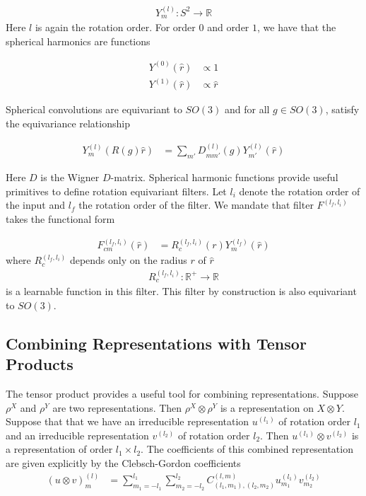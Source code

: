 \documentclass[book.tex]{subfiles}
\begin{document}
\begin{align}
    Y^{(l)}_m: S^2 \to \mathbb{R}
\end{align}
Here $l$ is again the rotation order. For order $0$ and order $1$, we have that the spherical harmonics are functions

\begin{align}
    Y^{(0)}(\hat{r}) &\propto 1 \\
    Y^{(1)}(\hat{r}) &\propto \hat{r} 
\end{align}

Spherical convolutions are equivariant to $SO(3)$ and for all $g \in SO(3)$, satisfy the equivariance relationship
    
\begin{align}
    Y^{(l)}_m(R(g)\hat{r}) &= \sum_{m'} D^{(l)}_{mm'}(g)Y^{(l)}_{m'}(\hat{r})
\end{align}

Here $D$ is the Wigner $D$-matrix. Spherical harmonic functions provide useful primitives to define rotation equivariant filters. Let $l_i$ denote the rotation order of the input and $l_f$ the rotation order of the filter. We mandate that filter $F^{(l_f, l_i)}$ takes the functional form

\begin{align}
    F^{(l_f, l_i)}_{cm}(\hat{r}) &= R_c^{(l_f, l_i)}(r) Y^{(l_f)}_m(\hat{r})
\end{align}
where $R_c^{(l_f, l_i)}$ depends only on the radius $r$ of $\hat{r}$ 
\begin{align}
R_c^{(l_f, l_i)}: \mathbb{R}^+ \to \mathbb{R}
\end{align} is a learnable function in this filter. This filter by construction is also equivariant to $SO(3)$. 

\subsection{Combining Representations with Tensor Products}

The tensor product provides a useful tool for combining representations. Suppose $\rho^X$ and $\rho^Y$ are two representations. Then $\rho^X \otimes \rho^Y$ is a representation on $X \otimes Y$. Suppose that that we have an irreducible representation $u^{(l_1)}$ of rotation order $l_1$ and an irreducible representation $v^{(l_2)}$ of rotation order $l_2$. Then $u^{(l_1)} \otimes v^{(l_2)}$ is a representation of order $l_1 \times l_2$. The coefficients of this combined representation are given explicitly by the Clebsch-Gordon coefficients
\begin{align}
(u \otimes v)^{(l)}_m &= \sum_{m_1=-l_1}^{l_1} \sum_{m_2=-l_2}^{l_2} C^{(l,m)}_{(l_1,m_1),(l_2,m_2)} u^{(l_1)}_{m_1} v^{(l_2)}_{m_2}
\end{align}
\end{document}

